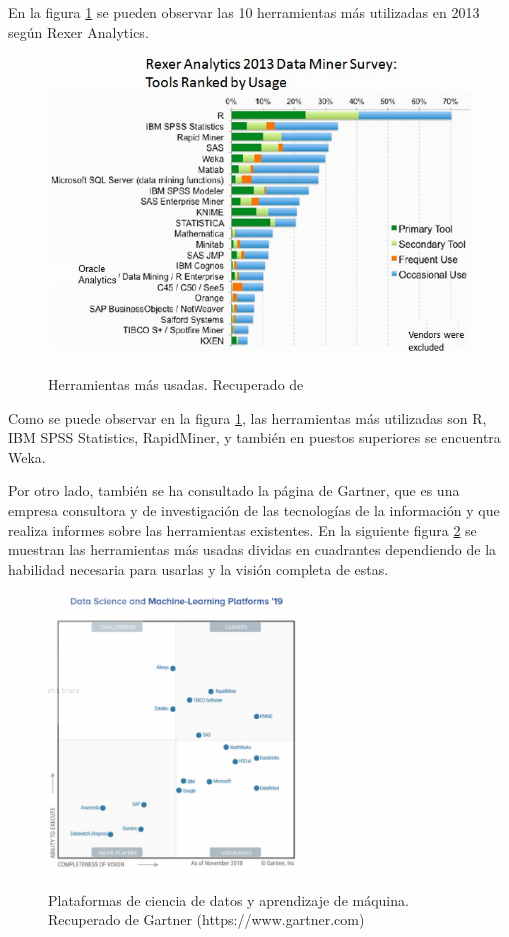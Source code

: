En la figura \ref{fig:top10tools} se pueden observar las 10 herramientas más utilizadas en 2013 según Rexer Analytics. \cite{rexer2013}

\begin{figure}[htb]
	\centering
	\caption{Herramientas más usadas. Recuperado de \protect\cite{rexer2013}}
	\includegraphics[width=1\textwidth]{recursos/top10tools}
	\label{fig:top10tools}
\end{figure}
\FloatBarrier

Como se puede observar en la figura \ref{fig:top10tools}, las herramientas más utilizadas son R, IBM SPSS Statistics, RapidMiner, y también en puestos superiores se encuentra Weka.

Por otro lado, también se ha consultado la página de Gartner, que es una empresa consultora y de investigación de las tecnologías de la información y que realiza informes sobre las herramientas existentes. En la siguiente figura \ref{fig:gartner} se muestran las herramientas más usadas dividas en cuadrantes dependiendo de la habilidad necesaria para usarlas y la visión completa de estas.

\begin{figure}[htb]
	\centering
	\caption{Plataformas de ciencia de datos y aprendizaje de máquina. Recuperado de Gartner (https://www.gartner.com)}
	\includegraphics[width=0.6\textwidth]{recursos/gartner}
	\label{fig:gartner}
\end{figure}
\FloatBarrier

